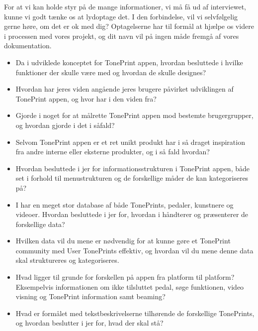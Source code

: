 For at vi kan holde styr på de mange informationer, vi må få ud af interviewet, kunne vi godt tænke os at lydoptage det. I den forbindelse, vil vi selvfølgelig gerne høre, om det er ok med dig? Optagelserne har til formål at hjælpe os videre i processen med vores projekt, og dit navn vil på ingen måde fremgå af vores dokumentation.

\begin{itemize}
  \item Da i udviklede konceptet for TonePrint appen, hvordan besluttede i hvilke funktioner der skulle være med og hvordan de skulle designes?\\
  \item Hvordan har jeres viden angående jeres brugere påvirket udviklingen af TonePrint appen, og hvor har i den viden fra?\\
  \item Gjorde i noget for at målrette TonePrint appen mod bestemte brugergrupper, og hvordan gjorde i det i såfald?\\
  \item Selvom TonePrint appen er et ret unikt produkt har i så draget inspiration fra andre interne eller eksterne produkter, og i så fald hvordan?\\
\end{itemize}

\begin{itemize}
  \item Hvordan besluttede i jer for informationsstrukturen i TonePrint appen, både set i forhold til menustrukturen og de forskellige måder de kan kategoriseres på?\\
  \item I har en meget stor database af både TonePrints, pedaler, kunstnere og videoer. Hvordan besluttede i jer for,  hvordan i håndterer og præsenterer de forskellige data?\\
  \item Hvilken data vil du mene er nødvendig for at kunne gøre et TonePrint community med User TonePrints effektiv, og hvordan vil du mene denne data skal struktureres og kategoriseres.\\
  \item Hvad ligger til grunde for forskellen på appen fra platform til platform? Eksempelvis informationen om ikke tilsluttet pedal, søge funktionen, video visning og TonePrint information samt beaming?\\
  \item Hvad er formålet med tekstbeskrivelserne tilhørende de forskellige TonePrints, og hvordan beslutter i jer for, hvad der skal stå?\\
\end{itemize}

